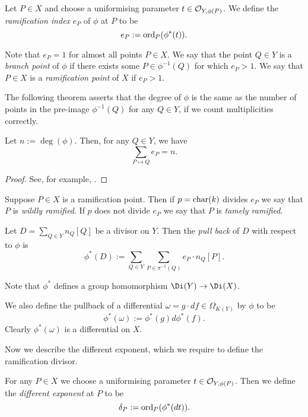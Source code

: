     \begin{defn}
    Let $P \in X$ and choose a uniformising parameter $t \in {\cal O}_{Y,\phi(P)}$.
    We define the \emph{ramification index} $e_P$ of $\phi$ at $P$ to be
        \[
        e_P := \operatorname{ord}_P(\phi^*(t)).
        \]
    \end{defn}

Note that $e_P =1$ for almost all points $P \in X$.
We say that the point $Q \in Y$ is a \emph{branch point} of $\phi$ if there exists some $P \in \phi^{-1}(Q)$ for which $e_P >1$.
We say that $P \in X$ is a \emph{ramification point} of $X$ if $e_P >1$.

The following theorem asserts that the degree of $\phi$ is the same as the number of points in the pre-image $\phi^{-1}(Q)$ for any $Q \in Y$, if we count multiplicities correctly.

    \begin{thm}
    Let $n := \deg(\phi)$.
    Then, for any $Q \in Y$, we have 
        \[
        \sum_{P \mapsto Q} e_P = n.
        \]
    \end{thm}
    \begin{proof}
    See, for example, \cite[Pg.\ 290]{liu}.
    \end{proof}

    
Suppose $P \in X$ is a ramification point.
Then if $p = \operatorname{char}(k)$ divides $e_P$ we say that $P$ is \emph{wildly ramified}.
If $p$ does not divide $e_P$ we say that $P$ is \emph{tamely ramified}.

    \begin{defn}
    Let $D = \sum_{Q \in Y}n_Q [Q]$ be a divisor on $Y$.
    Then the \emph{pull back} of $D$ with respect to $\phi$ is
        \[
        \phi^*(D) := \sum_{Q \in Y} \sum_{P \in \pi^{-1}(Q)} e_P \cdot n_Q [P].
        \]
    \end{defn}

Note that $\phi^*$ defines a group homomorphism $\Di(Y) \ra \Di(X)$.


We also define the pullback of a differential $\omega = g\cdot df \in \Omega_{K(Y)}$ by $\phi$ to be
    \[
    \phi^*(\omega) := \phi^*(g)d\phi^*(f).
    \]
Clearly $\phi^*(\omega)$ is a differential on $X$.


Now we describe the different exponent, which we require to define the ramification divisor.
    \begin{defn}\label{definitiondifferent}
    For any $P\in X$ we choose a uniformising parameter $t \in {\cal O}_{Y,\phi(P)}$.
    Then we define the \emph{different exponent} at $P$ to be 
        \[
        \delta_P : = \operatorname{ord}_P(\phi^*(dt)).
        \]
    \end{defn}

